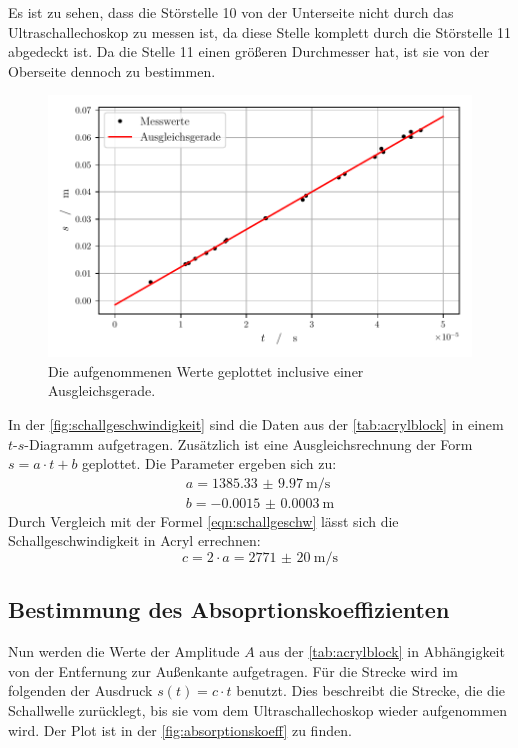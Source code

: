   \noindent Es ist zu sehen, dass die Störstelle 10 von der Unterseite nicht durch das Ultraschallechoskop zu messen ist, da diese Stelle komplett durch die 
  Störstelle 11 abgedeckt ist. Da die Stelle 11 einen größeren Durchmesser hat, ist sie von der Oberseite dennoch zu bestimmen. 

  \begin{figure}[H]
    \centering
    \includegraphics[width=\textwidth]{build/schallgeschwindigkeit.pdf}
    \caption{Die aufgenommenen Werte geplottet inclusive einer Ausgleichsgerade.}
    \label{fig:schallgeschwindigkeit}    
  \end{figure}

  \noindent In der \autoref{fig:schallgeschwindigkeit} sind die Daten aus der \autoref{tab:acrylblock} in einem $t$-$s$-Diagramm aufgetragen. Zusätzlich 
  ist eine Ausgleichsrechnung der Form $ s = a \cdot t + b $ geplottet. Die Parameter ergeben sich zu:
  \begin{align*}
    a = \SI{1385.33(997)}{\metre\per\second}\\
    b = \SI{-0.0015(3)}{\metre}
  \end{align*}
  Durch Vergleich mit der Formel \eqref{eqn:schallgeschw} lässt sich die Schallgeschwindigkeit in Acryl errechnen:
  \begin{equation*}
    c = 2 \cdot a = \SI{2771(20)}{\metre\per\second}
  \end{equation*}


\subsection{Bestimmung des Absoprtionskoeffizienten}

  Nun werden die Werte der Amplitude $A$ aus der \autoref{tab:acrylblock} in Abhängigkeit von der Entfernung zur Außenkante aufgetragen. Für die Strecke 
  wird im folgenden der Ausdruck $ s(t) = c \cdot t $ benutzt. Dies beschreibt die Strecke, die die Schallwelle zurücklegt, bis sie vom dem Ultraschallechoskop
  wieder aufgenommen wird. Der Plot ist in der \autoref{fig:absorptionskoeff} zu finden. 

